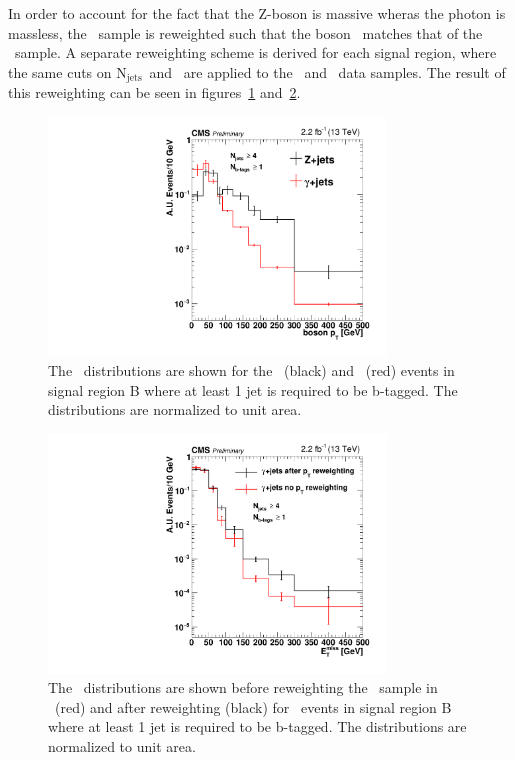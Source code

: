 In order to account for the fact that the Z-boson is massive wheras the photon is massless, 
the \gjets\ sample is reweighted such that the boson \pt\ matches that of the \zjets\ sample.
A separate reweighting scheme is derived for each signal region, where the same cuts on $\mathrm{N_{jets}}$\ and \HT\ are applied to the \zjets\ and \gjets\ data samples.
The result of this reweighting can be seen in figures~\ref{fig:photonptreweighting} and~\ref{fig:metptreweighting}.

\clearpage

\begin{figure}[!htb]
  \begin{center}
      \includegraphics[width=0.8\textwidth]{bkgd/figs/photon_SRB_2p1fb_vs_dilep_ptg_withb.pdf}
    \caption{
      The \pt\ distributions are shown for the \zjets\ (black) and \gjets\ (red) events
      in signal region B where at least 1 jet is required to be b-tagged.
      The distributions are normalized to unit area.
      \label{fig:photonptreweighting}
    }
  \end{center}
\end{figure}

\begin{figure}[!htb]
  \begin{center}
      \includegraphics[width=0.8\textwidth]{bkgd/figs/gjets_full2p1_rawMET_withb_SRB_datavsdata_comparereweighted.pdf}
    \caption{
      \label{fig:metptreweighting}
      The \MET\ distributions are shown before reweighting the \gjets\ sample in \pt\ (red) and after reweighting (black)
      for \gjets\ events in signal region B where at least 1 jet is required to be b-tagged.
      The distributions are normalized to unit area.
    }
  \end{center}
\end{figure}

